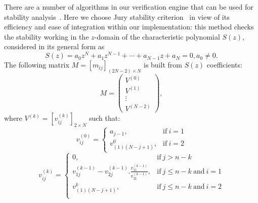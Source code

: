 \documentclass[twocolumn]{autart}    %
\begin{document}
  There are a number of algorithms in our verification engine that can
  be used for stability analysis~\cite{daes20161, Bessa16}.
Here we choose Jury stability criterion~\cite{astrom1997computer} in view of its efficiency 
and ease of integration within our implementation: 
this method checks the stability working in the $z$-domain of the characteristic polynomial $S(z)$,  
%
%
considered in its general form as 
%
\begin{equation*}
S(z) = a_0z^N+a_1z^{N-1}+\cdots+a_{N-1}z+a_N=0, a_0\neq0. 
\end{equation*}
The following matrix
$M = [m_{ij}]_{(2N-2)\times N}$ is built from $S(z)$ coefficients:
%
$$
M=\left( 
\begin{array}{c}
V^{(0)}\\
V^{(1)}\\
\vdots\\
V^{(N-2)}
\end{array}
\right), 
$$
%
where $V^{(k)} = [v^{(k)}_{ij} ]_{2\times N}$ such that:
%
$$
v_{ij}^{(0)}=\left\{
\begin{array}{ll}
a_{j-1}, & \mbox{if}~i=1\\
v_{(1)(N-j+1)}^{0},&\mbox{if}~i=2
\end{array}
\right.
$$
%
$$
v_{ij}^{(k)}=\left\{
\begin{array}{ll}
0,&\mbox{if}~j>n-k\\
v_{1j}^{(k-1)}-v_{2j}^{(k-1)} . \frac{v_{11}^{(k-1)}}{v_{21}^{(k-1)}}, & \mbox{if}~j\leq n-k ~\mbox{and}~i=1\\
v_{(1)(N-j+1)}^{k},& \mbox{if}~j\leq n-k ~\mbox{and}~i=2\\
\end{array}
\right.
$$
\end{document}
